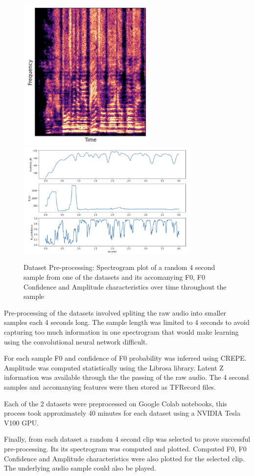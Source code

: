 \begin{figure}[!ht]
    \centering
    \includegraphics[width=0.6\textwidth]{research/dataset_preparation/PreprocessingSpecplot.png}
    \includegraphics[width=0.8\textwidth]{research/dataset_preparation/PreprocessingFeatures.png}
    \caption{Dataset Pre-processing: Spectrogram plot of a random 4 second sample from one of the datasets and its accomanying F0, F0 Confidence and Amplitude characteristics over time throughout the sample}
\end{figure}

Pre-processing of the datasets involved spliting the raw audio into smaller samples each 4 seconds long. The sample length was limited to 4 seconds to avoid capturing too much information in one spectrogram that would make learning using the convolutional neural network difficult.

For each sample F0 and confidence of F0 probability was inferred using CREPE\cite{CREPE}. Amplitude was computed statistically using the Librosa library\cite{LibrosaPip}. Latent Z information was available through the the passing of the raw audio. The 4 second samples and accomanying features were then stored as TFRecord files.

Each of the 2 datasets were preprocessed on Google Colab notebooks, this process took approximately 40 minutes for each dataset using a NVIDIA Tesla V100 GPU.

Finally, from each dataset a random 4 second clip was selected to prove successful pre-processing. Its its spectrogram was computed and plotted. Computed F0, F0 Confidence and Amplitude characteristics were also plotted for the selected clip. The underlying audio sample could also be played.